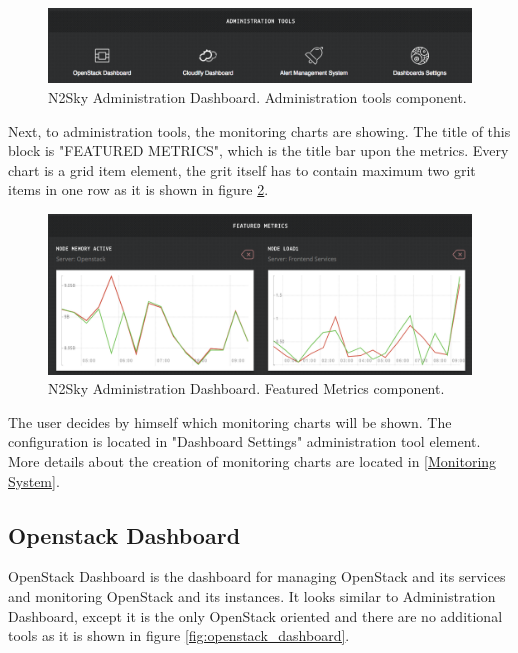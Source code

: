 \begin{figure}[H]
\begin{center}
  \includegraphics[width=\linewidth]{components/4/pics/admin_tools.png}
  \caption{N2Sky Administration Dashboard. Administration tools component.}
  \label{fig:admin_tools}
\end{center}
\end{figure}

Next, to administration tools, the monitoring charts are showing. The title of this block is "FEATURED METRICS", which is the title bar upon the metrics.
Every chart is a grid item element, the grit itself has to contain maximum two grit items in one row as it is shown in figure \ref{fig:featured_metrics}. 
 
\begin{figure}[H]
\begin{center}
  \includegraphics[width=\linewidth]{components/4/pics/featured_metrics.png}
  \caption{N2Sky Administration Dashboard. Featured Metrics component.}
  \label{fig:featured_metrics}
\end{center}
\end{figure}
 
 
The user decides by himself which monitoring charts will be shown. The configuration is located in "Dashboard Settings" administration tool element. More details about the creation of monitoring charts are located in \autoref{Monitoring System}. 


\subsection{Openstack Dashboard}\label{OpenStack Dashboard}

OpenStack Dashboard is the dashboard for managing OpenStack and its services and monitoring OpenStack and its instances. It looks similar to Administration Dashboard, except it is the only OpenStack oriented and there are no additional tools as it is shown in  figure \ref{fig:openstack_dashboard}. 

